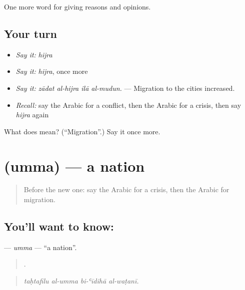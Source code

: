 \begin{grammarlens}[title={What you've built}]
One more word for giving reasons and opinions.
\end{grammarlens}

\subsection*{Your turn}
\begin{itemize}
\raggedright
  \item \emph{Say it:} \emph{hijra}
  \item \emph{Say it:} \emph{hijra}, once more
  \item \emph{Say it:} \emph{zādat al-hijra ilā al-mudun.} — Migration to the cities increased.
  \item \emph{Recall:} say the Arabic for a conflict, then the Arabic for a crisis, then say \emph{hijra} again
\end{itemize}

\begin{tcolorbox}[breakable,colback=teal!4,colframe=teal!35!black,title={Before you move on}]
What does  mean? (\textquotedblleft{}Migration\textquotedblright{}.) Say it once more.
\end{tcolorbox}
\section[\texorpdfstring{\ar{أمة} (umma)}{أمة (umma)}]{ (umma) — a nation}

\label{lesson:AR-C387-umma}



\begin{quote}
Before the new one: say the Arabic for a crisis, then the Arabic for migration.
\end{quote}

\subsection*{You'll want to know: }
\textbf{} — \emph{umma} — \textquotedblleft{}a nation\textquotedblright{}.

\begin{quote}
   .
\end{quote}

\begin{quote}
\emph{taḥtafilu al-umma bi-ʿīdihā al-waṭanī.}
\end{quote}

